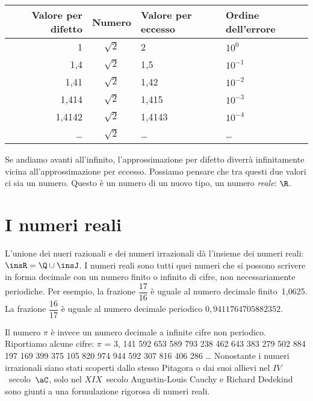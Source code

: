 \begin{center}
 \begin{tabular}{rcll}
\toprule
Valore per difetto & Numero &Valore per eccesso & Ordine dell'errore\\
\midrule
1 & \(\sqrt{2}\)  & 2  & \(10^{0}\)\\
1,4 & \(\sqrt{2}\) & 1,5  & \(10^{-1}\)\\
1,41 & \(\sqrt{2}\) & 1,42 & \(10^{-2}\)\\
1,414 & \(\sqrt{2}\) &1,415 & \(10^{-3}\)\\
1,4142 & \(\sqrt{2}\) & 1,4143 & \(10^{-4}\)\\
\ldots & \(\sqrt{2}\) & \ldots & \ldots\\
\bottomrule
\end{tabular}
\end{center}

Se andiamo avanti all'infinito, l'approssimazione per difetto diverrà 
infinitamente vicina all'approssimazione per eccesso. 
Possiamo pensare che tra questi due valori ci sia un numero. Questo è un 
numero di un nuovo tipo, un numero \emph{reale}: \(\R\).

\section{I numeri reali}
\label{sec:radicali_reali}

L'unione dei nueri razionali e dei numeri irrazionali dà l'insieme dei 
numeri reali: \(\insR=\Q \cup \insJ\).
I numeri reali sono tutti quei numeri che si possono scrivere in forma 
decimale con un numero finito o infinito di cifre, non necessariamente 
periodiche.
Per esempio, la frazione \(\dfrac{17}{16}\) è uguale al numero decimale 
finito~1,0625.
La frazione \(\dfrac{16}{17}\) è uguale al numero decimale periodico 
\(0,\overline{9411764705882352}\).

Il numero \(\pi\) è invece un numero decimale a infinite cifre non periodico. 
Riportiamo alcune cifre:
\(\pi \) = 3, 141 592 653 589 793 238 462 643 383 279 502 884 197 169 399 375 
105 820 974 944 592 307 816 406 286
\ldots 
Nonostante i numeri irrazionali siano stati scoperti dallo stesso Pitagora o 
dai suoi allievi nel \(IV\)~secolo~\(\aC\), solo nel \(XIX\)~secolo 
Augustin-Louis 
Cauchy e Richard Dedekind sono giunti a una formulazione rigorosa di numeri 
reali.


